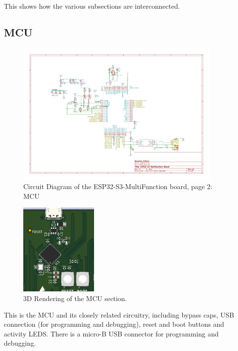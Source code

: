 This shows how the various subsections are interconnected.
\subsection{MCU}
\begin{figure}[hbpt]\begin{centering}%
\includegraphics[width=4in]{ESP32-S3-MultiFunction-2.pdf}
\caption{Circuit Diagram of the ESP32-S3-MultiFunction board, page 2: MCU}
\end{centering}\end{figure}
\begin{figure}[hbpt]\begin{centering}%
\includegraphics{ESP32-S3-MultiFunction-top3D-MCU.png}
\caption{3D Rendering of the MCU section.}
\end{centering}\end{figure}

This is the MCU and its closely related circuitry, including bypass caps, USB 
connection (for programming and debugging), reset and boot buttons and 
activity LEDS.  There is a micro-B USB connector for programming and 
debugging. 

